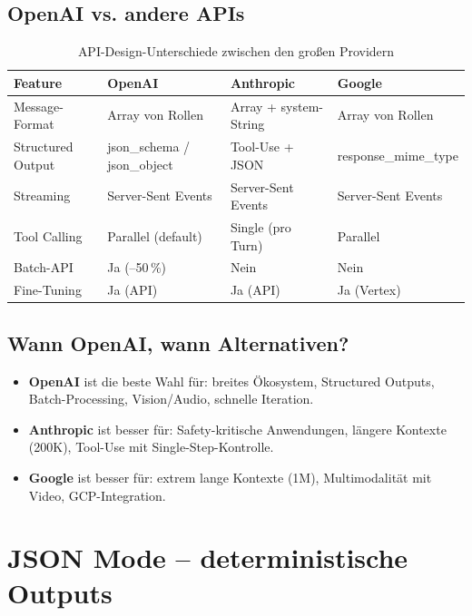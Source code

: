 \subsection{OpenAI vs. andere APIs}

\begin{table}[H]
\centering
\begin{tabularx}{\linewidth}{lXXX}
\toprule
\textbf{Feature} & \textbf{OpenAI} & \textbf{Anthropic} & \textbf{Google} \\
\midrule
Message-Format & Array von Rollen & Array + system-String & Array von Rollen \\
Structured Output & json\_schema / json\_object & Tool-Use + JSON & response\_mime\_type \\
Streaming & Server-Sent Events & Server-Sent Events & Server-Sent Events \\
Tool Calling & Parallel (default) & Single (pro Turn) & Parallel \\
Batch-API & Ja (--50\,\%) & Nein & Nein \\
Fine-Tuning & Ja (API) & Ja (API) & Ja (Vertex) \\
\bottomrule
\end{tabularx}
\caption{API-Design-Unterschiede zwischen den großen Providern}
\label{tab:api-compare}
\end{table}

\subsection{Wann OpenAI, wann Alternativen?}

\begin{itemize}[leftmargin=*]
    \item \textbf{OpenAI} ist die beste Wahl für: breites Ökosystem, Structured Outputs, Batch-Processing, Vision/Audio, schnelle Iteration.
    \item \textbf{Anthropic} ist besser für: Safety-kritische Anwendungen, längere Kontexte (200K), Tool-Use mit Single-Step-Kontrolle.
    \item \textbf{Google} ist besser für: extrem lange Kontexte (1M), Multimodalität mit Video, GCP-Integration.
\end{itemize}

\section{JSON Mode -- deterministische Outputs}


